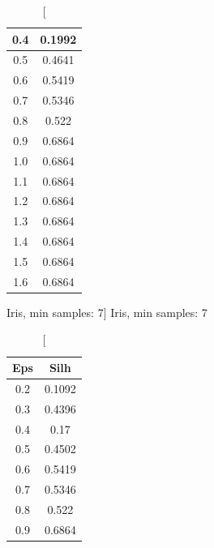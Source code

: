 \documentclass{classrep}
\begin{document}
{{{\begin{table}[!htbp]
\begin{minipage}{.24\textwidth}
\begin{tabular}{|c|c|}
                            0.4 & 0.1992 \\ \hline
                            0.5 & 0.4641 \\ \hline
                            0.6 & 0.5419 \\ \hline
                            0.7 & 0.5346 \\ \hline
                            0.8 & 0.522 \\ \hline
                            0.9 & 0.6864 \\ \hline
                            1.0 & 0.6864 \\ \hline
                            1.1 & 0.6864 \\ \hline
                            1.2 & 0.6864 \\ \hline
                            1.3 & 0.6864 \\ \hline
                            1.4 & 0.6864 \\ \hline
                            1.5 & 0.6864 \\ \hline
                            1.6 & 0.6864 \\ \hline
                        \end{tabular}
                        \caption
                        [Iris, min samples: 7]
                        {Iris, min samples: 7}
                        \label{db_scan_table_Iris_eucl_min_sample7}
                    \end{minipage}
                    \hfill
                    \begin{minipage}{.24\textwidth}
                        \centering
                        \begin{tabular}{|c|c|}
                            \hline
                            Eps & Silh \\ \hline
                            0.2 & 0.1092 \\ \hline
                            0.3 & 0.4396 \\ \hline
                            0.4 & 0.17 \\ \hline
                            0.5 & 0.4502 \\ \hline
                            0.6 & 0.5419 \\ \hline
                            0.7 & 0.5346 \\ \hline
                            0.8 & 0.522 \\ \hline
                            0.9 & 0.6864 \\ \hline

\end{tabular}
\end{minipage}
\end{table}}}}
\end{document}
